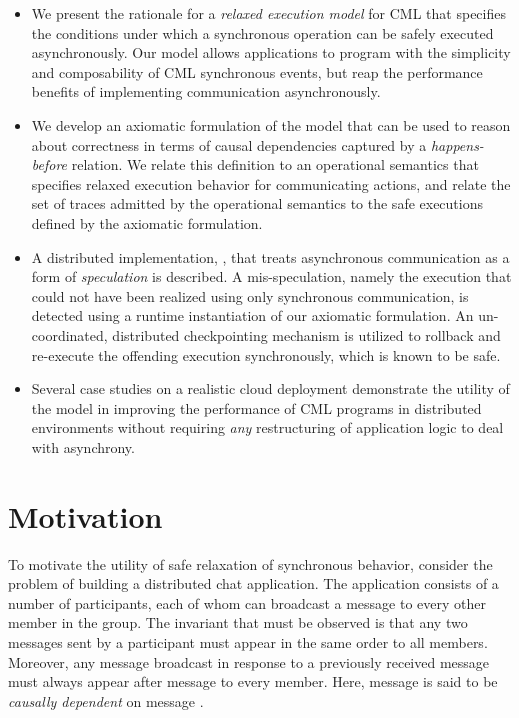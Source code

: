 \begin{itemize}

\item We present the rationale for a \emph{relaxed execution model} for CML
that specifies the conditions under which a synchronous operation can be safely
executed asynchronously.  Our model allows applications to program with the
simplicity and composability of CML synchronous events, but reap the
performance benefits of implementing communication asynchronously.

\item We develop an axiomatic formulation of the model that can be used to
reason about correctness in terms of causal dependencies captured by a
\emph{happens-before} relation.  We relate this definition to an operational
semantics that specifies relaxed execution behavior for communicating actions,
and relate the set of traces admitted by the operational semantics to the safe
executions defined by the axiomatic formulation.

\item A distributed implementation, \rxcml, that treats asynchronous
communication as a form of \emph{speculation} is described. A mis-speculation,
namely the execution that could not have been realized using only synchronous
communication, is detected using a runtime instantiation of our axiomatic
formulation. An un-coordinated, distributed checkpointing mechanism is utilized
to rollback and re-execute the offending execution synchronously, which is
known to be safe.

\item Several case studies on a realistic cloud deployment demonstrate the
utility of the model in improving the performance of CML programs in
distributed environments without requiring \emph{any} restructuring of
application logic to deal with asynchrony.

\end{itemize}

\section{Motivation}

To motivate the utility of safe relaxation of synchronous behavior, consider
the problem of building a distributed chat application. The application
consists of a number of participants, each of whom can broadcast a message to
every other member in the group. The invariant that must be observed is that
any two messages sent by a participant must appear in the same order to all
members. Moreover, any message  broadcast in response to a previously
received message  must always appear after message  to every
member. Here, message  is said to be \emph{causally dependent} on
message .

